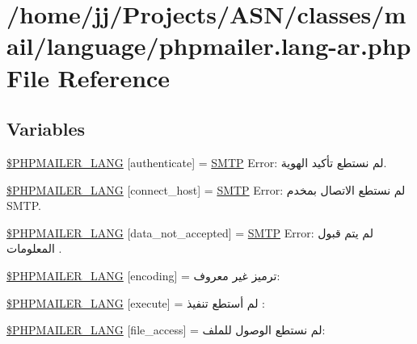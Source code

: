 \hypertarget{phpmailer_8lang-ar_8php}{}\section{/home/jj/\+Projects/\+A\+S\+N/classes/mail/language/phpmailer.lang-\/ar.php File Reference}
\label{phpmailer_8lang-ar_8php}
\subsection*{Variables}
\begin{DoxyCompactItemize}
\item 
\hyperlink{phpmailer_8lang-ar_8php_a2cb33073c989b85580748e331ed8b4aa}{\$\+P\+H\+P\+M\+A\+I\+L\+E\+R\+\_\+\+L\+A\+NG} \mbox{[}\textquotesingle{}authenticate\textquotesingle{}\mbox{]} = \textquotesingle{}\hyperlink{class_s_m_t_p}{S\+M\+TP} Error\+: لم نستطع تأكيد الهوية.\textquotesingle{}
\item 
\hyperlink{phpmailer_8lang-ar_8php_a2ee0cc637a06b96e45600db31c6799ee}{\$\+P\+H\+P\+M\+A\+I\+L\+E\+R\+\_\+\+L\+A\+NG} \mbox{[}\textquotesingle{}connect\+\_\+host\textquotesingle{}\mbox{]} = \textquotesingle{}\hyperlink{class_s_m_t_p}{S\+M\+TP} Error\+: لم نستطع الاتصال بمخدم S\+M\+T\+P.\textquotesingle{}
\item 
\hyperlink{phpmailer_8lang-ar_8php_a814c6b191205d2361b3233e9c9d6fda5}{\$\+P\+H\+P\+M\+A\+I\+L\+E\+R\+\_\+\+L\+A\+NG} \mbox{[}\textquotesingle{}data\+\_\+not\+\_\+accepted\textquotesingle{}\mbox{]} = \textquotesingle{}\hyperlink{class_s_m_t_p}{S\+M\+TP} Error\+: لم يتم قبول المعلومات .\textquotesingle{}
\item 
\hyperlink{phpmailer_8lang-ar_8php_a817f7283f3d54c970a0c10305cc668cc}{\$\+P\+H\+P\+M\+A\+I\+L\+E\+R\+\_\+\+L\+A\+NG} \mbox{[}\textquotesingle{}encoding\textquotesingle{}\mbox{]} = \textquotesingle{}ترميز غير معروف\+: \textquotesingle{}
\item 
\hyperlink{phpmailer_8lang-ar_8php_a668217a9563a168f30f2a8548b6ed5a9}{\$\+P\+H\+P\+M\+A\+I\+L\+E\+R\+\_\+\+L\+A\+NG} \mbox{[}\textquotesingle{}execute\textquotesingle{}\mbox{]} = \textquotesingle{}لم أستطع تنفيذ \+: \textquotesingle{}
\item 
\hyperlink{phpmailer_8lang-ar_8php_a7e83349023b856ef9e5c46e30ae6d51e}{\$\+P\+H\+P\+M\+A\+I\+L\+E\+R\+\_\+\+L\+A\+NG} \mbox{[}\textquotesingle{}file\+\_\+access\textquotesingle{}\mbox{]} = \textquotesingle{}لم نستطع الوصول للملف\+: \textquotesingle{}

\end{DoxyCompactItemize}
